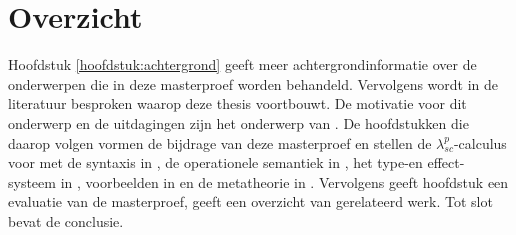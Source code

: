 \section{Overzicht}
Hoofdstuk \ref{hoofdstuk:achtergrond} geeft meer achtergrondinformatie over de onderwerpen die in deze masterproef worden behandeld. Vervolgens wordt in  de literatuur besproken waarop deze thesis voortbouwt. De motivatie voor dit onderwerp en de uitdagingen zijn het onderwerp van . De hoofdstukken die daarop volgen vormen de bijdrage van deze masterproef en stellen de $\lambda_{sc}^{p}$-calculus voor met de syntaxis in , de operationele semantiek in , het type-en effect-systeem in , voorbeelden in  en de metatheorie in . Vervolgens geeft hoofdstuk  een evaluatie van de masterproef,  geeft een overzicht van gerelateerd werk. Tot slot bevat  de conclusie.

